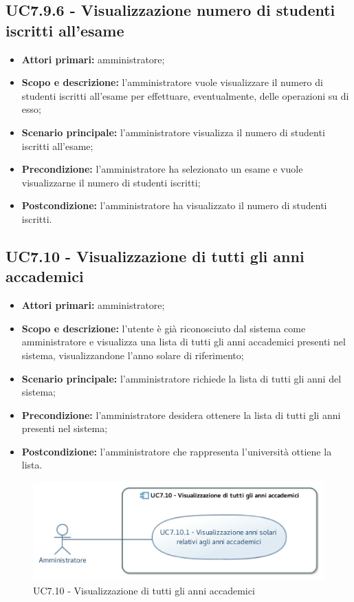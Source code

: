 \documentclass[AnalisiDeiRequisiti.tex]{subfiles}
\begin{document}
\subsection{UC7.9.6 - Visualizzazione numero di studenti iscritti all'esame}
\begin{itemize}
	\item \textbf{Attori primari:} amministratore;
	\item \textbf{Scopo e descrizione:} l'amministratore vuole visualizzare il numero di studenti iscritti all'esame per effettuare, eventualmente, delle operazioni su di esso;
	\item \textbf{Scenario principale:} l'amministratore visualizza il numero di studenti iscritti all'esame;
	\item \textbf{Precondizione:} l'amministratore ha selezionato un esame e vuole visualizzarne il numero di studenti iscritti; 
	\item \textbf{Postcondizione:} l'amministratore ha visualizzato il numero di studenti iscritti.
\end{itemize}\subsection{UC7.10 - Visualizzazione di tutti gli anni accademici}
\begin{itemize}
\item \textbf{Attori primari:} amministratore;
\item \textbf{Scopo e descrizione:} l'utente è già riconosciuto dal sistema come amministratore e visualizza una lista di tutti gli anni accademici presenti nel sistema, visualizzandone l'anno solare di riferimento;
\item \textbf{Scenario principale:} l'amministratore richiede la lista di tutti gli anni del sistema;
\item \textbf{Precondizione:} l'amministratore desidera ottenere la lista di tutti gli anni presenti nel sistema; 
\item \textbf{Postcondizione:} l'amministratore che rappresenta l'università ottiene la lista.
\end{itemize}
\begin{figure}[H]
	\centering
	\includegraphics[width=0.7\linewidth]{UC7_10.jpg}
	\caption{UC7.10 - Visualizzazione di tutti gli anni accademici}
	\label{UC7.10 - Visualizzazione di tutti gli anni accademici}
\end{figure}
\end{document}
